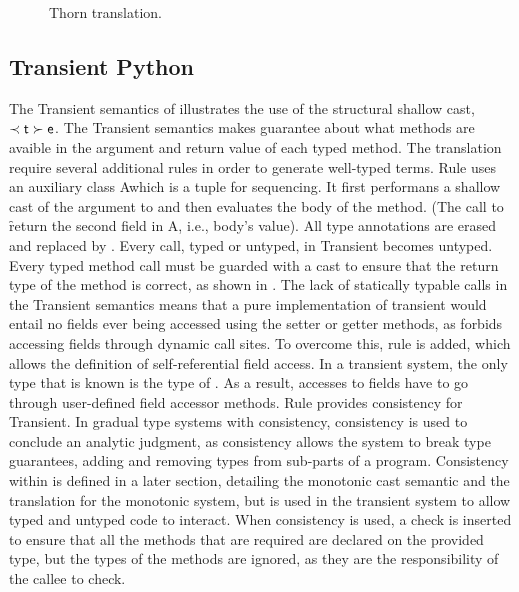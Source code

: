 \documentclass[a4paper,USenglish]{tex/lipics-v2016}
\begin{document}
\begin{figure}[h!]
\begin{mathpar}

\end{mathpar}
\caption{Thorn translation.}
\label{fig:thorntrans_exp}
\end{figure}



\subsection{Transient Python}

\newcommand{\A}{\EMxt A}

The Transient semantics of  illustrates the use of the
structural shallow cast, $\ShaCast\t\e$. The Transient semantics makes
guarantee about what methods are avaible in the argument and return value of
each typed method.  The translation require several additional rules in
order to generate well-typed terms. Rule  uses an auxiliary
class \A which is a tuple for sequencing. It first performans a shallow cast
of the argument \x to \C and then evaluates the body of the method. (The
call to \f return the second field in \A, i.e., body's value).  All type
annotations are erased and replaced by \any.  Every call, typed or untyped,
in Transient becomes untyped.  Every typed method call must be guarded with
a cast to ensure that the return type of the method is correct, as shown in
.  The lack of statically typable calls in the Transient
semantics means that a pure implementation of transient would entail no
fields ever being accessed using the setter or getter methods, as \kafka
forbids accessing fields through dynamic call sites. To overcome this, rule
 is added, which allows the definition of self-referential
field access. In a transient system, the only type that is known is the type
of \this.  As a result, accesses to fields have to go through user-defined
field accessor methods.  Rule  provides consistency for
Transient. In gradual type systems with consistency, consistency is used to
conclude an analytic judgment, as consistency allows the system to break
type guarantees, adding and removing types from sub-parts of a
program. Consistency within \kafka is defined in a later section, detailing
the monotonic cast semantic and the translation for the monotonic system,
but is used in the transient system to allow typed and untyped code to
interact. When consistency is used, a check is inserted to ensure that all
the methods that are required are declared on the provided type, but the
types of the methods are ignored, as they are the responsibility of the
callee to check.
\end{document}
